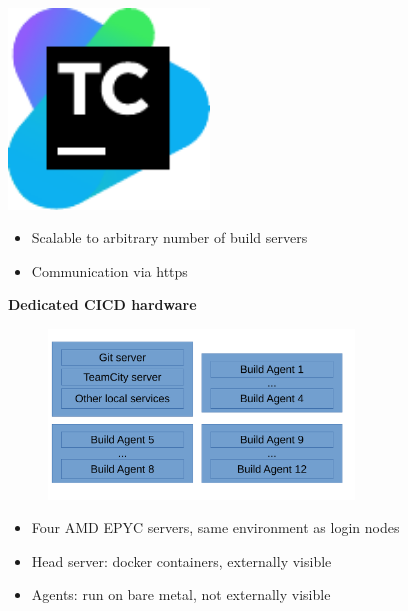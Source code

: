 \documentclass[english,xcolor=pst,11pt]{beamer}
\begin{document}
\begin{frame}
\begin{minipage}{0.45\textwidth}
        \includegraphics[width=0.4\textwidth]{logos/teamcity.pdf}
        \end{minipage}

\vfill
\begin{itemize}
 \item Scalable to arbitrary number of build servers
 \item Communication via https
\end{itemize}




\end{frame}

\begin{frame}
\textbf{Dedicated CICD hardware}
 \begin{figure}[H]
	\centering
    {\includegraphics[width=3.2in]{diagrams/hardware.pdf}}
\end{figure}

\begin{itemize}
 \item Four AMD EPYC servers, same environment  as login nodes
 \item Head server: docker containers, externally visible
 \item Agents: run on bare metal, not externally visible
\end{itemize}

\end{frame}
\end{document}
